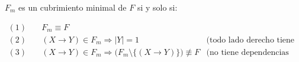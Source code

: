 \documentclass[preview]{standalone}
\begin{document}
$F_m$ es un cubrimiento minimal de $F$ si y solo si:

\begin{align*}
(1)\quad & F_m \equiv F & \\
(2)\quad  & (X\rightarrow Y) \in F_m \Longrightarrow |Y| = 1& \text{(todo lado derecho tiene un solo atributo)}\\
(3)\quad  & (X\rightarrow Y) \in F_m \Longrightarrow \Big(F_m\setminus\big\{(X\rightarrow Y)\big\}\Big)\not\equiv F & \text{(no tiene dependencias redundantes)}\\
\end{align*}
\end{document}
